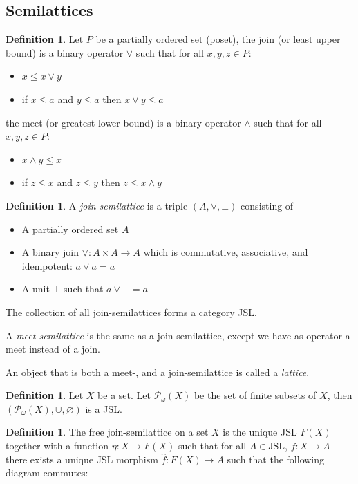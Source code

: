 \documentclass[12pt]{article}
\theoremstyle{definition}
\newtheorem{definition}[theorem]{Definition}
\newcommand{\1}{\mathbbm{1}}
\newcommand{\finP}{\mathcal{P}_{\omega}}
\newcommand{\JSL}{\text{JSL}}
\begin{document}
\subsection{Semilattices}
\begin{definition}
    Let $P$ be a partially ordered set (poset), the join (or least upper bound) is a binary operator $\vee$ such that for all $x,y,z\in P$:
    \begin{itemize}
        \item $x\leq x\vee y$
        \item if $x\leq a$ and $y\leq a$ then $x\vee y\leq a$
    \end{itemize}

    the meet (or greatest lower bound) is a binary operator $\wedge$ such that for all $x,y,z\in P$:
        \begin{itemize}
        \item $x\wedge y\leq x$
        \item if $z\leq x$ and $z\leq y$ then $z\leq x\wedge y$
    \end{itemize}
\end{definition}

\begin{definition}
    A \emph{join-semilattice} is a triple $(A, \vee, \bot)$ consisting of
    \begin{itemize}
        \item A partially ordered set $A$
        \item A binary join $\vee: A\times A \to A$ which is commutative, associative, and idempotent: $a\vee a = a$
        \item A unit $\bot$ such that $a \vee\bot = a$
    \end{itemize}

    The collection of all join-semilattices forms a category JSL.

    A \emph{meet-semilattice} is the same as a join-semilattice, except we have as operator a meet instead of a join.

    An object that is both a meet-, and a join-semilattice is called a \emph{lattice}. 
\end{definition}

\begin{definition}
    Let $X$ be a set. Let $\finP(X)$ be the set of finite subsets of $X$, then $(\finP(X), \cup, \varnothing)$ is a JSL.
\end{definition}

\begin{definition}
    The free join-semilattice on a set $X$ is the unique JSL $F(X)$ together with a function $\eta: X\to F(X)$ such that for all $A\in\JSL$, $f: X \to A$ there exists a unique JSL morphism $\hat{f}: F(X)\to A$ such that the following diagram commutes:
    \begin{center}
    \end{center}
\end{definition}
\end{document}
